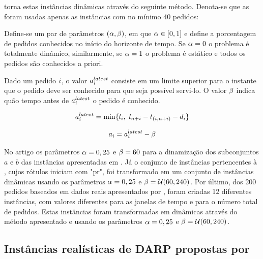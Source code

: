 \documentclass{anpet}
\begin{document}
\textcite{berbeglia_hybrid_2012} torna estas instâncias dinâmicas através do seguinte método. Denota-se que as foram usadas apenas as instâncias com no mínimo 40 pedidos:

Define-se um par de parâmetros $(\alpha,\beta)$, em que $\alpha \in [0, 1]$ e define a porcentagem de pedidos conhecidos no início do horizonte de tempo. Se $\alpha = 0$ o problema é totalmente dinâmico, similarmente, se $\alpha = 1$ o problema é estático e todos os pedidos são conhecidos a priori.  

Dado um pedido $i$, o valor $a{}_{i{}}^{latest}$ consiste em um limite superior para o instante que o pedido deve ser conhecido para que seja possível servi-lo. O valor $\beta$ indica quão tempo antes de $a{}_{i{}}^{latest}$ o pedido é conhecido.

\begin{equation}
    \requestLatestArrivalTime = \min\{\latestTimeWindow_{\originNode},\ \latestTimeWindow_{\destinationNode}  - \arcTravelTime{\originNode}{\destinationNode} - \serviceTime_{\request}\}
    \label{eq:berbeglia_hybrid_2012_requestLatestArrivalTime}
\end{equation}

\begin{equation}
    a_{i} = a{}_{i{}}^{latest} - \beta
    \label{eq:berbeglia_hybrid_2012_requestArrivalTime}
\end{equation}

No artigo os parâmetros $\alpha = 0,25$ e $\beta = 60$ para a dinamização dos subconjuntos $a$ e $b$ das instâncias apresentadas em \textcite{ropke_models_2007}. Já o conjunto de instâncias pertencentes à \textcite{cordeau_tabu_2003}, cujos rótulos iniciam com "pr", foi transformado em um conjunto de instâncias dinâmicas usando os parâmetros $\alpha = 0,25$ e $\beta =\mathcal{U}(60,240)$. Por último, dos 200 pedidos baseados em dados reais apresentados por \textcite{cordeau_tabu_2003}, foram criadas 12 diferentes instâncias, com valores diferentes para as janelas de tempo e para o número total de pedidos. Estas instâncias foram transformadas em dinâmicas através do método apresentado e usando os parâmetros $\alpha = 0,25$ e $\beta =\mathcal{U}(60,240)$.

\subsection{Instâncias realísticas de DARP propostas por \textcite{schilde_metaheuristics_2011}}
\end{document}
